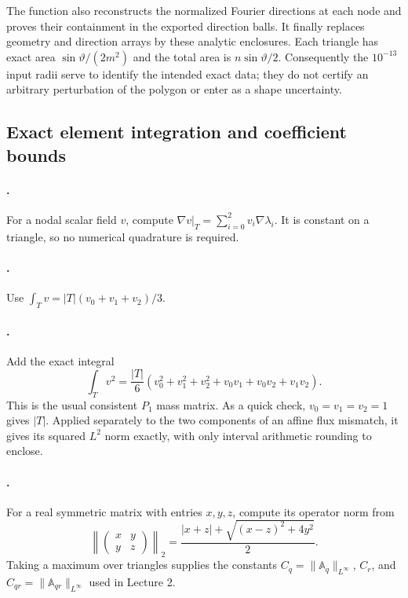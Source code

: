 The function also reconstructs the normalized Fourier directions at each
node and proves their containment in the exported direction balls.
It finally replaces geometry and direction arrays by these analytic
enclosures. Each triangle has exact area $\sin\vartheta/(2m^2)$ and the
total area is $n\sin\vartheta/2$. Consequently the $10^{-13}$ input radii
serve to identify the intended exact data; they do not certify an arbitrary
perturbation of the polygon or enter as a shape uncertainty.

\subsection{Exact element integration and coefficient bounds}
\paragraph{.}
For a nodal scalar field $v$, compute
$\nabla v|_T=\sum_{i=0}^2v_i\nabla\lambda_i$. It is constant on a
triangle, so no numerical quadrature is required.

\paragraph{.}
Use $\int_Tv=|T|(v_0+v_1+v_2)/3$.

\paragraph{.}
Add the exact integral
\begin{equation}
 \int_Tv^2=\frac{|T|}{6}
 (v_0^2+v_1^2+v_2^2+v_0v_1+v_0v_2+v_1v_2).
 \label{l3:mass}
\end{equation}
This is the usual consistent $P_1$ mass matrix. As a quick check,
$v_0=v_1=v_2=1$ gives $|T|$. Applied separately to the two components of
an affine flux mismatch, it gives its squared $L^2$ norm exactly, with
only interval arithmetic rounding to enclose.

\paragraph{.}
For a real symmetric matrix with entries $x,y,z$, compute its operator norm
from
\[
 \left\|\begin{pmatrix}x&y\\y&z\end{pmatrix}\right\|_2
   =\frac{|x+z|+\sqrt{(x-z)^2+4y^2}}2.
\]
Taking a maximum over triangles supplies the constants
$C_q=\|\mathbb A_q\|_{L^\infty}$, $C_r$, and
$C_{qr}=\|\mathbb A_{qr}\|_{L^\infty}$ used in Lecture 2.

